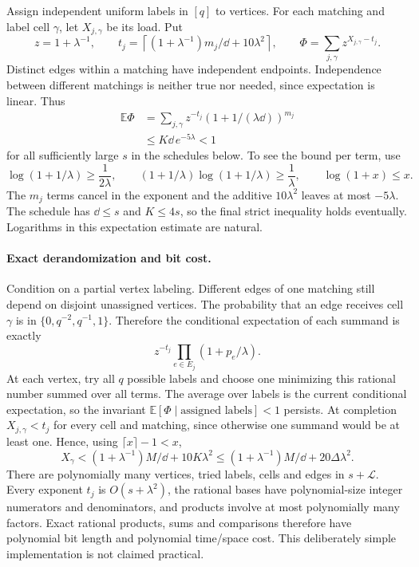 Assign independent uniform labels in $[q]$ to vertices. For each matching and label cell
$\gamma$, let $X_{j,\gamma}$ be its load. Put
\[
 z=1+\lambda^{-1},\qquad
 t_j=\left\lceil(1+\lambda^{-1})m_j/\dd+10\lambda^2\right\rceil,
 \qquad \Phi=\sum_{j,\gamma}z^{X_{j,\gamma}-t_j}.
\]
Distinct edges within a matching have independent endpoints. Independence between different
matchings is neither true nor needed, since expectation is linear. Thus
\begin{align*}
 \mathbb E\Phi
 &=\sum_{j,\gamma}z^{-t_j}(1+1/(\lambda\dd))^{m_j}\\
 &\le K\dd\,e^{-5\lambda}<1
\end{align*}
for all sufficiently large $s$ in the schedules below. To see the bound per term, use
\[
 \log(1+1/\lambda)\ge\frac1{2\lambda},\qquad
 (1+1/\lambda)\log(1+1/\lambda)\ge\frac1\lambda,
 \qquad \log(1+x)\le x.
\]
The $m_j$ terms cancel in the exponent and the additive $10\lambda^2$ leaves at most
$-5\lambda$. The schedule has $\dd\le s$ and $K\le4s$, so the final strict inequality
holds eventually. Logarithms in this expectation estimate are natural.

\paragraph{Exact derandomization and bit cost.}
Condition on a partial vertex labeling. Different edges of one matching still depend on
disjoint unassigned vertices. The probability that an edge receives cell $\gamma$ is in
$\{0,q^{-2},q^{-1},1\}$. Therefore the conditional expectation of each summand is exactly
\[
 z^{-t_j}\prod_{e\in E_j}(1+p_e/\lambda).
\]
At each vertex, try all $q$ possible labels and choose one minimizing this rational number
summed over all terms. The average over labels is the current conditional expectation,
so the invariant $\mathbb E[\Phi\mid\text{assigned labels}]<1$ persists.
At completion $X_{j,\gamma}<t_j$ for every cell and matching, since otherwise one summand
would be at least one. Hence, using $\lceil x\rceil-1<x$,
\begin{equation}\label{eq:load}
 X_\gamma<(1+\lambda^{-1})M/\dd+10K\lambda^2
 \le(1+\lambda^{-1})M/\dd+20\Delta\lambda^2.
\end{equation}
There are polynomially many vertices, tried labels, cells and edges in $s+\mathcal L$.
Every exponent $t_j$ is $O(s+\lambda^2)$, the rational bases have polynomial-size
integer numerators and denominators, and products involve at most polynomially many factors.
Exact rational products, sums and comparisons therefore have polynomial bit length and
polynomial time/space cost. This deliberately simple implementation is not claimed practical.

